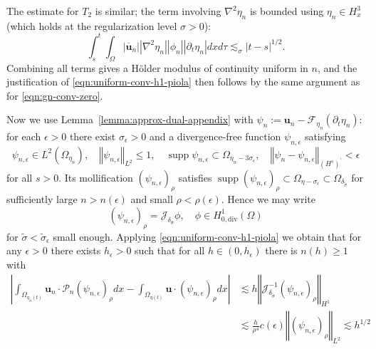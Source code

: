 \documentclass[10pt,a4paper]{article}
\numberwithin{equation}{section}
\begin{document}
The estimate for $T_2$ is similar; the term involving $\nabla^{2}\eta_n$ is bounded using $\eta_n\in H_x^3$ (which holds at the regularization level $\sigma>0$):
\begin{equation}
\int_{s}^{t}\int_{\Omega}\left|\overline{\mathbf{u}}_{n}\right|\left|\nabla^{2}\eta_{n}\right|\left|\phi_{n}\right|\left|\partial_{t}\eta_{n}\right|dxd\tau\lesssim_{\sigma}\left|t-s\right|^{1/2}.
\end{equation}
Combining all terms gives a H\"{o}lder modulus of continuity uniform in $n$, and the justification of \eqref{eqn:uniform-conv-h1-piola} then follows by the same argument as for \eqref{eqn:gn-conv-zero}.

Now we use Lemma~\ref{lemma:approx-dual-appendix} with $\psi_{n}:=\mathbf{u}_{n}-\mathcal{F}_{\eta_{n}}\left(\partial_{t}\eta_{n}\right)$: for each $\epsilon>0$ there exist $\sigma_{\epsilon}>0$ and a divergence-free function $\psi_{n,\epsilon}$ satisfying
\[
\psi_{n,\epsilon}\in L^{2}\left(\Omega_{\eta_{n}}\right),\quad\left\Vert \psi_{n,\epsilon}\right\Vert _{L^{2}}\le1,\quad\operatorname{supp}\psi_{n,\epsilon}\subset\Omega_{\eta_{n}-3\sigma_{\epsilon}},\quad\left\Vert \psi_{n}-\psi_{n,\epsilon}\right\Vert _{\left(H^{s}\right)^{\prime}}<\epsilon
\]
for all $s>0$. Its mollification $\left(\psi_{n,\epsilon}\right)_{\rho}$ satisfies $\operatorname{supp}\left(\psi_{n,\epsilon}\right)_{\rho}\subset\Omega_{\eta-\sigma_{\epsilon}}\subset\Omega_{\delta_{\tilde{\sigma}}}$ for sufficiently large $n>n(\epsilon)$ and small $\rho<\rho(\epsilon)$. Hence we may write
\[
\left(\psi_{n,\epsilon}\right)_{\rho}=\mathcal{J}_{\delta_{\tilde{\sigma}}}\phi,\quad\phi\in H_{0,\text{div}}^{1}(\Omega)
\]
for $\tilde{\sigma}<\tilde{\sigma}_{\epsilon}$ small enough. Applying \eqref{eqn:uniform-conv-h1-piola} we obtain that for any $\epsilon>0$ there exists $h_{\epsilon}>0$ such that for all $h\in(0,h_{\epsilon})$ there is $n(h)\ge 1$ with
\begin{equation}\label{eqn:conv-piolatilde-unif}
\begin{aligned}\left|\int_{\Omega_{\eta_{n}\left(t\right)}}\mathbf{u}_{n}\cdot\mathcal{P}_{n}\left(\psi_{n,\epsilon}\right)_{\rho}dx-\int_{\Omega_{\eta\left(t\right)}}\mathbf{u}\cdot\left(\psi_{n,\epsilon}\right)_{\rho}dx\right| & \lesssim h\left\Vert \mathcal{J}_{\delta_{\tilde\sigma}}^{-1}\left(\psi_{n,\epsilon}\right)_{\rho}\right\Vert _{H^{1}}\\
 & \lesssim\frac{h}{\rho^{4}}c\left(\epsilon\right)\left\Vert \left(\psi_{n,\epsilon}\right)_{\rho}\right\Vert _{L^{2}}\lesssim h^{1/2}
\end{aligned}
\end{equation}
\end{document}
